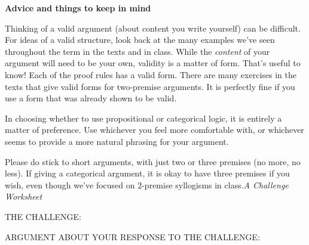 \documentclass[oneside, openany]{book} %
\begin{document}
\noindent \textbf{Advice and things to keep in mind}

\noindent 

\noindent 

\noindent 

\noindent Thinking of a valid argument (about content you write yourself) can be difficult. For ideas of a valid structure, look back at the many examples we've seen throughout the term in the texts and in class. While the \textit{content }of your argument will need to be your own, validity is a matter of form. That's useful to know! Each of the proof rules has a valid form. There are many exercises in the texts that give valid forms for two-premise arguments. It is perfectly fine if you use a form that was already shown to be valid.

\noindent In choosing whether to use propositional or categorical logic, it is entirely a matter of preference. Use whichever you feel more comfortable with, or whichever seems to provide a more natural phrasing for your argument.

\noindent Please do stick to short arguments, with just two or three premises (no more, no less). If giving a categorical argument, it is okay to have three premises if you wish, even though we've focused on 2-premise syllogisms in class.\textit{A Challenge Worksheet}

\noindent 

\noindent 

\noindent 

\noindent 

\noindent THE CHALLENGE:

\noindent 

\noindent 

\noindent 

\noindent 

\noindent ARGUMENT ABOUT YOUR RESPONSE TO THE CHALLENGE:

\noindent 

\noindent 

\noindent 

\noindent 

\noindent 

\noindent 

\noindent 

\noindent 

\noindent 

\noindent 

\noindent 

\noindent 
\end{document}
